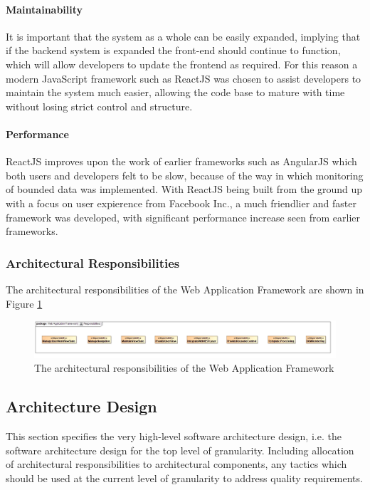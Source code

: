 \paragraph{Maintainability}
It is important that the system as a whole can be easily expanded, implying
that if the backend system is expanded the front-end should continue to function,
which will allow developers to update the frontend as required. For this reason
a modern JavaScript framework such as ReactJS was chosen to assist developers 
to maintain the system much easier, allowing the code base to mature with time
without losing strict control and structure.

\paragraph{Performance}
ReactJS improves upon the work of earlier frameworks such as AngularJS which both
users and developers felt to be slow, because of the way in which monitoring of
bounded data was implemented. With ReactJS being built from the ground up with a
focus on user expierence from Facebook Inc., a much friendlier and faster framework
was developed, with significant performance increase seen from earlier frameworks.

	
\subsubsection{Architectural Responsibilities}
The architectural responsibilities of the Web Application Framework are shown in 
Figure \ref{fig:webApplicationFrameworkResponsibilities}
\begin{figure}[H]
	\begin{center}
	\includegraphics[scale=0.35]{../Diagrams and Charts/Web Application Framework/Responsibilities.jpg}
	\caption{The architectural responsibilities of the Web Application Framework}
	\label{fig:webApplicationFrameworkResponsibilities}
	\end{center}
\end{figure}

\subsection{Architecture Design}
This section specifies the very high-level software architecture design, i.e.
the software architecture design for the top level of granularity. Including 
allocation of architectural responsibilities to architectural components, any
tactics which should be used at the current level of granularity to address
quality requirements.

